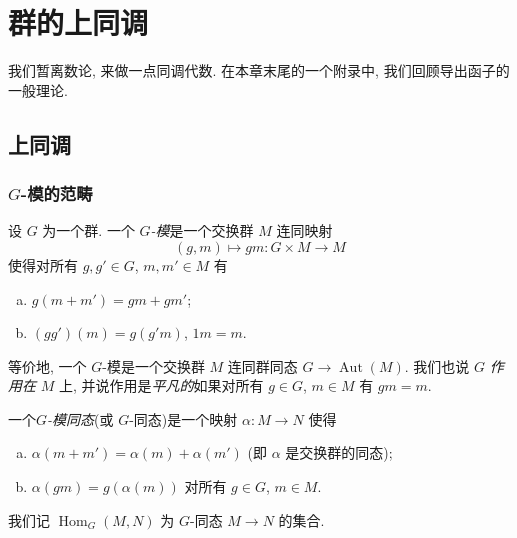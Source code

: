 
\providecommand{\Res}{\operatorname{Res}}
\providecommand{\Cor}{\operatorname{Cor}}
\providecommand{\Inf}{\operatorname{Inf}}
\providecommand{\Ver}{\operatorname{Ver}}
\providecommand{\Coker}{\operatorname{Coker}}
\providecommand{\Ab}{\mathsf{Ab}}      %
\providecommand{\Mod}{\mathsf{Mod}}    %

\chapter{群的上同调}\label{ch:II}

我们暂离数论, 来做一点同调代数. 在本章末尾的一个附录中, 我们回顾导出函子的一般理论.

\section{上同调}\label{sec:II.1}

\subsection{\texorpdfstring{$G$}{G}-模的范畴}

设 $G$ 为一个群. 一个 \emph{$G$-模}是一个交换群 $M$ 连同映射
\[
 (g,m)\mapsto g m\colon G\times M\to M
\]
使得对所有 $g,g'\in G$, $m,m'\in M$ 有
\begin{enumerate}[(a)]
\item $g(m+m')=g m+g m'$;
\item $(gg')(m)=g(g'm)$, $1m=m$.
\end{enumerate}
等价地, 一个 $G$-模是一个交换群 $M$ 连同群同态 $G\to\operatorname{Aut}(M)$. 我们也说 $G$ \emph{作用在} $M$ 上, 并说作用是\emph{平凡的}如果对所有 $g\in G$, $m\in M$ 有 $gm=m$.

一个\emph{$G$-模同态}(或 $G$-同态)是一个映射 $\alpha\colon M\to N$ 使得
\begin{enumerate}[(a)]
\item $\alpha(m+m')=\alpha(m)+\alpha(m')$ (即 $\alpha$ 是交换群的同态);
\item $\alpha(gm)=g(\alpha(m))$ 对所有 $g\in G$, $m\in M$.
\end{enumerate}
我们记 $\operatorname{Hom}_G(M,N)$ 为 $G$-同态 $M\to N$ 的集合.

